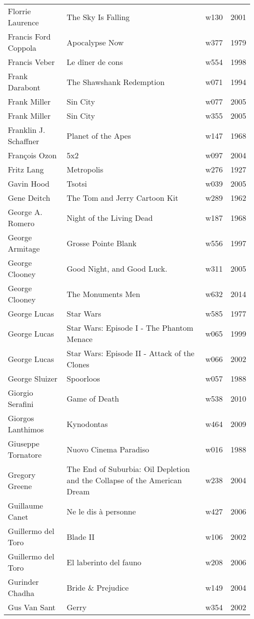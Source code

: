 \documentclass{article}
\begin{document}
\begin {center}
\begin{longtable}{l p{10cm} l l}
Florrie Laurence & The Sky Is Falling & w130 & 2001 \\
Francis Ford Coppola & Apocalypse Now & w377 & 1979 \\
Francis Veber & Le dîner de cons & w554 & 1998 \\
Frank Darabont & The Shawshank Redemption & w071 & 1994 \\
Frank Miller & Sin City & w077 & 2005 \\
Frank Miller & Sin City & w355 & 2005 \\
Franklin J. Schaffner & Planet of the Apes & w147 & 1968 \\
François Ozon & 5x2 & w097 & 2004 \\
Fritz Lang & Metropolis & w276 & 1927 \\
Gavin Hood & Tsotsi & w039 & 2005 \\
Gene Deitch & The Tom and Jerry Cartoon Kit & w289 & 1962 \\
George A. Romero & Night of the Living Dead & w187 & 1968 \\
George Armitage & Grosse Pointe Blank & w556 & 1997 \\
George Clooney & Good Night, and Good Luck. & w311 & 2005 \\
George Clooney & The Monuments Men & w632 & 2014 \\
George Lucas & Star Wars & w585 & 1977 \\
George Lucas & Star Wars: Episode I - The Phantom Menace & w065 & 1999 \\
George Lucas & Star Wars: Episode II - Attack of the Clones & w066 & 2002 \\
George Sluizer & Spoorloos & w057 & 1988 \\
Giorgio Serafini & Game of Death & w538 & 2010 \\
Giorgos Lanthimos & Kynodontas & w464 & 2009 \\
Giuseppe Tornatore & Nuovo Cinema Paradiso & w016 & 1988 \\
Gregory Greene & The End of Suburbia: Oil Depletion and the Collapse of the American Dream & w238 & 2004 \\
Guillaume Canet & Ne le dis à personne & w427 & 2006 \\
Guillermo del Toro & Blade II & w106 & 2002 \\
Guillermo del Toro & El laberinto del fauno & w208 & 2006 \\
Gurinder Chadha & Bride \& Prejudice & w149 & 2004 \\
Gus Van Sant & Gerry & w354 & 2002 \\

\end{longtable}
\end{center}
\end{document}

